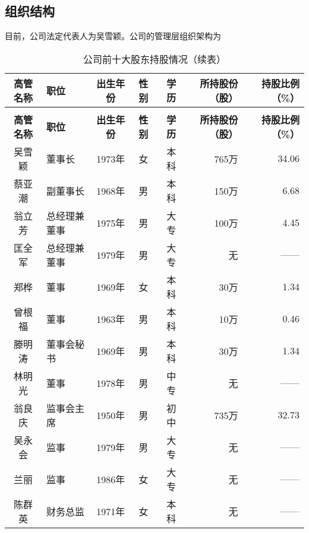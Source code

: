 \subsection{组织结构}
目前，公司法定代表人为吴雪颖。公司的管理层组织架构为
\renewcommand*{\arraystretch}{1}
\setlength{\tabcolsep}{8pt}
\begin{longtable}{>{\footnotesize}c>{\footnotesize}l>{\footnotesize}c>{\footnotesize}c>{\footnotesize}r>{\footnotesize}r>{\footnotesize}r}
\caption[公司前十大股东]{公司前十大股东持股情况}\\  %
\hline\hline
\rowcolor{mycyan} \bfseries 高管名称	&	\bfseries 职位	&	\bfseries 出生年份	& \bfseries	性别	& \bfseries	学历	&	\bfseries 所持股份（股）	& \bfseries	持股比例（\%）	\\  \endfirsthead          %
\caption[]{公司前十大股东持股情况（续表）} \\ 
\hline\hline
\rowcolor{mycyan} \bfseries 高管名称	&	\bfseries 职位	&	\bfseries 出生年份	& \bfseries	性别	& \bfseries	学历	&	\bfseries 所持股份（股）	& \bfseries	持股比例（\%）	\\   \endhead         %
\hline
\endfoot
\hline   %
吴雪颖	&	董事长	&	1973年	&	女	&	本科	&	765万	&	34.06	\\
蔡亚潮	&	副董事长	&	1968年	&	男	&	本科	&	150万	&	6.68	\\
翁立芳	&	总经理兼董事	&	1975年	&	男	&	大专	&	100万	&	4.45	\\
匡全军	&	总经理兼董事	&	1979年	&	男	&	大专	&	无	&	——	\\
郑桦	&	董事	&	1969年	&	女	&	本科	&	30万	&	1.34	\\
曾根福	&	董事	&	1963年	&	男	&	本科	&	10万	&	0.46	\\
滕明涛	&	董事会秘书	&	1969年	&	男	&	本科	&	30万	&	1.34	\\
林明光	&	董事	&	1978年	&	男	&	中专	&	无	&	——	\\
翁良庆	&	监事会主席	&	1950年	&	男	&	初中	&	735万	&	32.73	\\
吴永会	&	监事	&	1979年	&	男	&	大专	&	无	&	——	\\
兰丽	&	监事	&	1986年	&	女	&	大专	&	无	&	——	\\
陈群英	&	财务总监	&	1971年	&	女	&	本科	&	无	&	——	\\
\bottomrule
\end{longtable}

